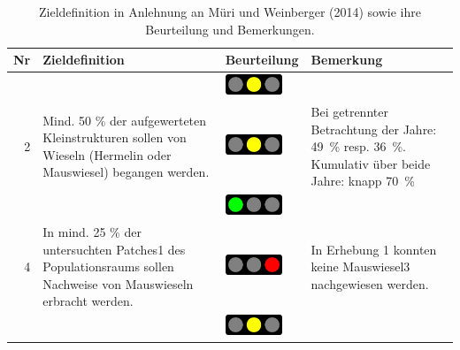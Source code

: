 \documentclass[
  oneside]{scrbook}
\begin{document}
\begin{table}

\caption{\label{tab:winziele}Zieldefinition in Anlehnung an Müri und Weinberger (2014) sowie ihre Beurteilung und Bemerkungen.}
\centering
\begin{tabular}[t]{rp{65mm}>{}lp{60mm}}
\toprule
Nr & Zieldefinition & Beurteilung & Bemerkung\\
\midrule
\cellcolor{gray!6}{1} & \cellcolor{gray!6}{In jedem Populationsraum sollen zu jeder Kontrollperiode Mauswiesel und Hermelin nachgewiesen werden.} & \cellcolor{gray!6}{}\includegraphics[width=0.67in, height=0.24in]{images/ampel_gelb.png} & \cellcolor{gray!6}{Es konnten zwar Hermeline, aber keine Mauswiesel nachgewiesen werden.}\\
2 & Mind. 50 \% der aufgewerteten Kleinstrukturen sollen von Wieseln (Hermelin oder Mauswiesel) begangen werden. & \includegraphics[width=0.67in, height=0.24in]{images/ampel_gelb.png} & Bei getrennter Betrachtung der Jahre: 49 \% resp. 36 \%. Kumulativ über beide Jahre: knapp 70 \%\\
\cellcolor{gray!6}{3} & \cellcolor{gray!6}{In mind. 75 \% der untersuchten Patches1 des Populationsraums sollen Nachweise von Hermelinen erbracht werden.} & \cellcolor{gray!6}{}\includegraphics[width=0.67in, height=0.24in]{images/ampel_gruen.png} & \cellcolor{gray!6}{In 10 von 11 untersuchten Patches (91 \%) konnten Nachweise von Hermelinen erbracht werden.}\\
4 & In mind. 25 \% der untersuchten Patches1 des Populationsraums sollen Nachweise von Mauswieseln erbracht werden. & \includegraphics[width=0.67in, height=0.24in]{images/ampel_rot.png} & In Erhebung 1 konnten keine Mauswiesel3 nachgewiesen werden.\\
\cellcolor{gray!6}{5} & \cellcolor{gray!6}{In jeder untersuchten Verbindungsachse sollen mindestens einmal pro Jahr Wiesel (mindestens Hermeline) nachgewiesen werden.} & \cellcolor{gray!6}{}\includegraphics[width=0.67in, height=0.24in]{images/ampel_gelb.png} & \cellcolor{gray!6}{Gemäss Datensatz A2 konnten auf 4 von 5 kontrollierten Korridoren Nachweise von Hermelin und Iltis gemacht werden}\\
\bottomrule
\end{tabular}
\end{table}
\end{document}
